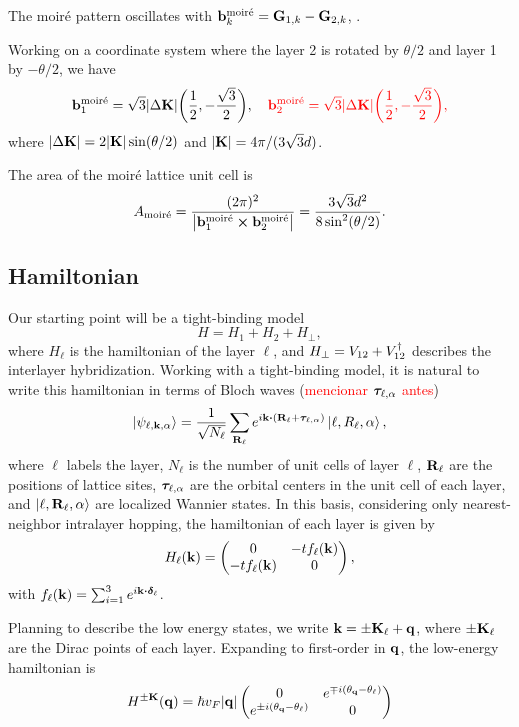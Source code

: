 \documentclass[a4paper,10pt]{article}
\begin{document}
The moiré pattern oscillates with $\vb{b}_k^{\text{moiré}} = \vb{G}_{1,k} - \vb{G}_{2,k}$, \cite{handbook2019}.

\n

Working on a coordinate system where the layer 2 is rotated by $\theta/2$ and layer 1 by $-\theta/2$, we have
$$
\vb{b}_1^{\text{moiré}} = \sqrt{3} \abs{\Delta {\vb{K}}} \qty(\frac{1}{2}, -\frac{\sqrt{3}}{2}), \quad
\textcolor{red}{\vb{b}_2^{\text{moiré}} = \sqrt{3} \abs{\Delta {\vb{K}}} \qty(\frac{1}{2}, -\frac{\sqrt{3}}{2}),}
$$
where $\abs{\Delta {\vb{K}}} = 2 \abs{{\vb{K}}} \sin(\theta/2)$ and $\abs{{\vb{K}}} = 4\pi/(3\sqrt{3} d)$.

The area of the moiré lattice unit cell is
$$
A_{\text{moiré}} = \frac{(2\pi)^2}{\abs{{\vb{b}}_1^{\text{moiré}} \cross {\vb{b}}_2^{\text{moiré}}}} = \frac{3\sqrt{3} d^2}{8 \sin[2](\theta/2)}.
$$

\subsection{Hamiltonian}

Our starting point will be a tight-binding model
$$
H = H_1 + H_2 + H_{\perp},
$$
where $H_\ell$ is the hamiltonian of the layer $\ell$, and $H_\perp = V_{12} + V_{12}^{\dagger}$ describes the interlayer hybridization. Working with a tight-binding model, it is natural to write this hamiltonian in terms of Bloch waves (\textcolor{red}{mencionar ${\bm{\tau}}_{\ell,\alpha}$ antes})
$$
\ket{\psi_{\ell, \k, \alpha}} = \frac{1}{\sqrt{N_\ell}} \sum_{\R_\ell} e^{i \k \vdot (\R_\ell + \vtau_{\ell,\alpha})} \ket{\ell, R_\ell, \alpha},
$$
where $\ell$ labels the layer, $N_\ell$ is the number of unit cells of layer $\ell$, ${\vb{R}}_\ell$ are the positions of lattice sites, ${\bm{\tau}}_{\ell,\alpha}$ are the orbital centers in the unit cell of each layer, and $\ket{\ell,{\vb{R}}_\ell,\alpha}$ are localized Wannier states. In this basis, considering only nearest-neighbor intralayer hopping, the hamiltonian of each layer is given by
$$
H_\ell({\vb{k}}) =
\begin{pmatrix}
0 & -t f_\ell({\vb{k}}) \\
-t f_\ell({\vb{k}}) & 0
\end{pmatrix},
$$
with $f_\ell(\k) = \sum_{i=1}^{3} e^{i\k \vdot \vdelta_\ell}$.

Planning to describe the low energy states, we write ${\vb{k}} = \pm {\vb{K}}_\ell + {\vb{q}}$, where $\pm {\vb{K}}_\ell$ are the Dirac points of each layer. Expanding to first-order in ${\vb{q}}$, the low-energy hamiltonian is
$$
H^{\pm {\vb{K}}}({\vb{q}}) = \hbar v_F \abs{{\vb{q}}}
\begin{pmatrix}
0 & e^{\mp i (\theta_{\vb{q}} - \theta_\ell)} \\
e^{\pm i (\theta_{\vb{q}} - \theta_\ell)} & 0
\end{pmatrix}
$$
\end{document}
